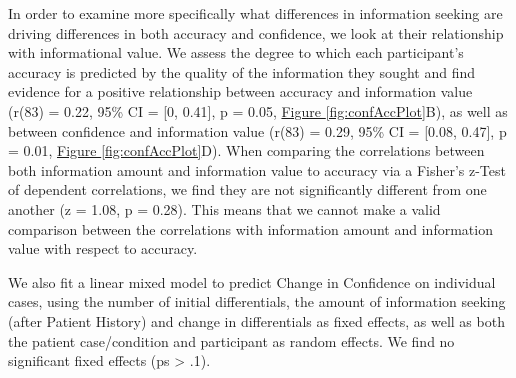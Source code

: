 \documentclass[a4paper, nobind]{templates/ociamthesis}
\begin{document}
\hfill\break
In order to examine more specifically what differences in information seeking are driving differences in both accuracy and confidence, we look at their relationship with informational value. We assess the degree to which each participant's accuracy is predicted by the quality of the information they sought and find evidence for a positive relationship between accuracy and information value (r(83) = 0.22, 95\% CI = {[}0, 0.41{]}, p = 0.05, \hyperref[fig:confAccPlot]{Figure \ref{fig:confAccPlot}}B), as well as between confidence and information value (r(83) = 0.29, 95\% CI = {[}0.08, 0.47{]}, p = 0.01, \hyperref[fig:confAccPlot]{Figure \ref{fig:confAccPlot}}D). When comparing the correlations between both information amount and information value to accuracy via a Fisher's z-Test of dependent correlations, we find they are not significantly different from one another (z = 1.08, p = 0.28). This means that we cannot make a valid comparison between the correlations with information amount and information value with respect to accuracy.

\hfill\break
We also fit a linear mixed model to predict Change in Confidence on individual cases, using the number of initial differentials, the amount of information seeking (after Patient History) and change in differentials as fixed effects, as well as both the patient case/condition and participant as random effects. We find no significant fixed effects (ps \textgreater{} .1).

\newpage
\end{document}
